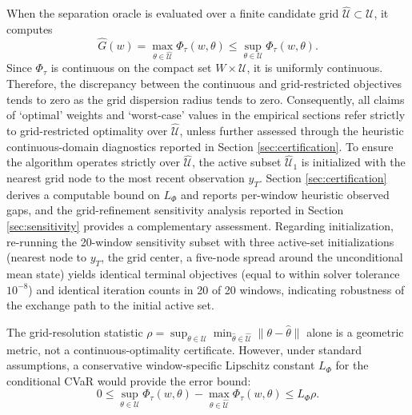\documentclass[smallextended]{svjour3}
\begin{document}
\begin{remark}
When the separation oracle is evaluated over a finite candidate grid $\widehat{\mathcal{U}} \subset \mathcal{U}$, it computes
\begin{equation}
\widehat{G}(w) = \max_{\theta \in \widehat{\mathcal{U}}} \Phi_\tau(w, \theta) \le \sup_{\theta \in \mathcal{U}} \Phi_\tau(w, \theta).
\end{equation}
Since $\Phi_\tau$ is continuous on the compact set $W \times \mathcal{U}$, it is uniformly continuous. Therefore, the discrepancy between the continuous and grid-restricted objectives tends to zero as the grid dispersion radius tends to zero. Consequently, all claims of `optimal' weights and `worst-case' values in the empirical sections refer strictly to grid-restricted optimality over $\widehat{\mathcal{U}}$, unless further assessed through the heuristic continuous-domain diagnostics reported in Section \ref{sec:certification}. To ensure the algorithm operates strictly over $\widehat{\mathcal{U}}$, the active subset $\widehat{\mathcal{U}}_1$ is initialized with the nearest grid node to the most recent observation $y_T$. Section \ref{sec:certification} derives a computable bound on $L_\Phi$ and reports per-window heuristic observed gaps, and the grid-refinement sensitivity analysis reported in Section \ref{sec:sensitivity} provides a complementary assessment. Regarding initialization, re-running the 20-window sensitivity subset with three active-set initializations (nearest node to $y_T$, the grid center, a five-node spread around the unconditional mean state) yields identical terminal objectives (equal to within solver tolerance $10^{-8}$) and identical iteration counts in 20 of 20 windows, indicating robustness of the exchange path to the initial active set.


The grid-resolution statistic $\rho = \sup_{\theta \in \mathcal{U}} \min_{\hat{\theta} \in \widehat{\mathcal{U}}} \|\theta - \hat{\theta}\|$ alone is a geometric metric, not a continuous-optimality certificate. However, under standard assumptions, a conservative window-specific Lipschitz constant $L_\Phi$ for the conditional CVaR would provide the error bound:
\begin{equation}
0 \le \sup_{\theta \in \mathcal{U}} \Phi_\tau(w, \theta) - \max_{\theta \in \widehat{\mathcal{U}}} \Phi_\tau(w, \theta) \le L_\Phi \rho.
\end{equation}


\end{remark}
\end{document}
